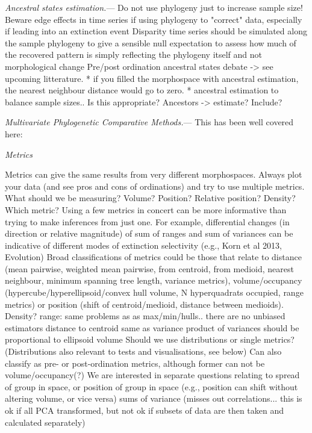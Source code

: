 \documentclass[12pt,letterpaper]{article}
\renewcommand{\subsection}[1]{%
\bigskip
\begin{center}
\begin{large}
\normalfont\itshape #1
\end{large}
\end{center}}
\renewcommand{\subsubsection}[1]{%
\vspace{2ex}
\noindent
\textit{#1.}---}
\begin{document}
\subsubsection{Ancestral states estimation}
Do not use phylogeny just to increase sample size!
Beware edge effects in time series if using phylogeny to "correct" data, especially if leading into an extinction event
Disparity time series should be simulated along the sample phylogeny to give a sensible null expectation to assess how much of the recovered pattern is simply reflecting the phylogeny itself and not morphological change
Pre/post ordination ancestral states debate -> see upcoming litterature.
* if you filled the morphospace with ancestral estimation, the nearest neighbour distance would go to zero. 
* ancestral estimation to balance sample sizes.. Is this appropriate?
Ancestors -> estimate? Include?

\subsubsection{Multivariate Phylogenetic Comparative Methods}
This has been well covered here: %

\subsection{Metrics}
\label{metrics}
Metrics can give the same results from very different morphospaces. Always plot your data (and see pros and cons of ordinations) and try to use multiple metrics.
What should we be measuring? Volume? Position? Relative position? Density? Which metric? Using a few metrics in concert can be more informative than trying to make inferences from just one. For example, differential changes (in direction or relative magnitude) of sum of ranges and sum of variances can be indicative of different modes of extinction selectivity (e.g., Korn et al 2013, Evolution)
Broad classifications of metrics could be those that relate to distance (mean pairwise, weighted mean pairwise, from centroid, from medioid, nearest neighbour, minimum spanning tree length, variance metrics), volume/occupancy (hypercube/hyperellipsoid/convex hull volume, N hyperquadrats occupied, range metrics) or position (shift of centroid/medioid, distance between medioids). Density?
range: same problems as as max/min/hulls.. there are no unbiased estimators
distance to centroid same as variance
product of variances should be proportional to ellipsoid volume
Should we use distributions or single metrics? (Distributions also relevant to tests and visualisations, see below)
Can also classify as pre- or post-ordination metrics, although former can not be volume/occupancy(?)
We are interested in separate questions relating to spread of group in space, or position of group in space (e.g., position can shift without altering volume, or vice versa)
sums of variance (misses out correlations... this is ok if all PCA transformed, but not ok if subsets of data are then taken and calculated separately)
\end{document}
